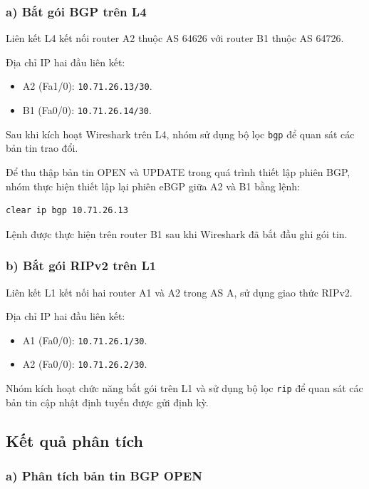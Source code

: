 \subsubsection{a) Bắt gói BGP trên L4}

Liên kết L4 kết nối router A2 thuộc AS 64626
với router B1 thuộc AS 64726.

Địa chỉ IP hai đầu liên kết:
\begin{itemize}
    \item A2 (Fa1/0): \texttt{10.71.26.13/30}.
    \item B1 (Fa0/0): \texttt{10.71.26.14/30}.
\end{itemize}

Sau khi kích hoạt Wireshark trên L4, nhóm sử dụng
bộ lọc \texttt{bgp} để quan sát các bản tin trao đổi.

Để thu thập bản tin OPEN và UPDATE trong quá trình
thiết lập phiên BGP, nhóm thực hiện thiết lập lại
phiên eBGP giữa A2 và B1 bằng lệnh:

\begin{verbatim}
clear ip bgp 10.71.26.13
\end{verbatim}

Lệnh được thực hiện trên router B1 sau khi
Wireshark đã bắt đầu ghi gói tin.

\subsubsection{b) Bắt gói RIPv2 trên L1}

Liên kết L1 kết nối hai router A1 và A2
trong AS A, sử dụng giao thức RIPv2.

Địa chỉ IP hai đầu liên kết:
\begin{itemize}
    \item A1 (Fa0/0): \texttt{10.71.26.1/30}.
    \item A2 (Fa0/0): \texttt{10.71.26.2/30}.
\end{itemize}

Nhóm kích hoạt chức năng bắt gói trên L1 và
sử dụng bộ lọc \texttt{rip} để quan sát các
bản tin cập nhật định tuyến được gửi định kỳ.

\subsection{Kết quả phân tích}

\subsubsection{a) Phân tích bản tin BGP OPEN}

